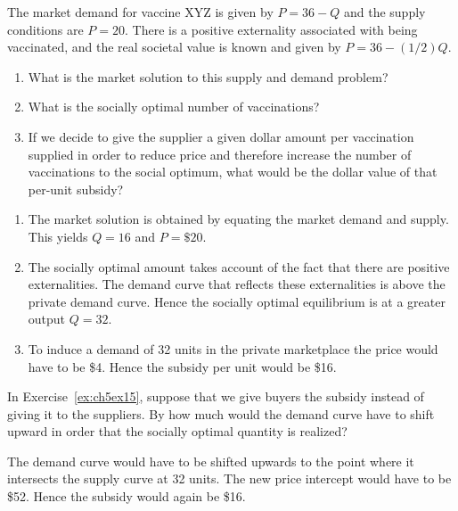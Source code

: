 \begin{enumialphparenastyle}
\begin{ex}
\begin{sol}
\end{sol}
\end{ex}

\begin{ex}\label{ex:ch5ex15}
The market demand for vaccine XYZ is given by $P=36-Q$ and the supply conditions are $P=20$. There is a positive externality associated with being vaccinated, and the real societal value is known and given by $P=36-(1/2)Q$.
\begin{enumerate}
	\item	What is the market solution to this supply and demand problem?
	\item	What is the socially optimal number of vaccinations?
	\item	If we decide to give the supplier a given dollar amount per vaccination supplied in order to reduce price and therefore increase the number of vaccinations to the social optimum, what would be the dollar value of that per-unit subsidy?
\end{enumerate}
\begin{sol}
\begin{enumerate}
	\item	The market solution is obtained by equating the market demand and supply. This yields $Q=16$ and $P=\$20$.
	\item	The socially optimal amount takes account of the fact that there are positive externalities. The demand curve that reflects these externalities is above the private demand curve. Hence the socially optimal equilibrium is at a greater output $Q=32$.
	\item	To induce a demand of 32 units in the private marketplace the price would have to be \$4. Hence the subsidy per unit would be \$16.
\end{enumerate}
\end{sol}
\end{ex}

\begin{ex}\label{ex:ch5ex16}
In Exercise~\ref{ex:ch5ex15}, suppose that we give buyers the subsidy instead of giving it to the suppliers. By how much would the demand curve have to shift upward in order that the socially optimal quantity is realized?
\begin{sol}
	The demand curve would have to be shifted upwards to the point where it intersects the supply curve at 32 units. The new price intercept would have to be \$52. Hence the subsidy would again be \$16.
	
\end{sol}
\end{ex}


\end{enumialphparenastyle}
